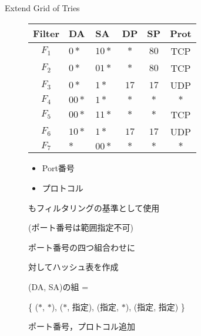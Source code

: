 \documentclass[12pt,dvipdfmx,mathserif,uplatex,aspectratio=32]{beamer}
\makeatletter
\newcommand{\tblcaption}[1]{\def\@captype{table}\caption{#1}}
\makeatother
\begin{document}
\begin{frame}{Extend Grid of Tries}

\begin{figure}[h]
 \def\@captype{table}
 \begin{minipage}[t]{.5\textwidth}
  {\scriptsize
  {\centering
  \begin{tabular}{c|l|l|c|c|c} 
   Filter   & DA      & SA     & DP     & SP     & Prot \\ \hline
   $F_{1} $ & $0*$    & $10*$  & $*$    & $80$   & TCP  \\ \hline
   $F_{2} $ & $0*$    & $01*$  & $*$    & $80$   & TCP  \\ \hline
   $F_{3} $ & $0*$    & $1*$   & $17$   & $17$   & UDP \\ \hline
   $F_{4} $ & $00*$   & $1*$   & $*$    & $*$    & $*$ \\ \hline
   $F_{5} $ & $00*$   & $11*$  & $*$    & $*$    & TCP \\ \hline
   $F_{6} $ & $10*$   & $1*$   & $17$   & $17$   & UDP \\ \hline
   $F_{7} $ & $*$     & $00*$  & $*$    & $*$    & $*$
  \end{tabular}
  \tblcaption{ポート番号，プロトコル追加}

  }
  }
  \end{minipage}
  \hfill
  \begin{minipage}[c]{.48\textwidth}
   \begin{itemize}
    \item Port番号
    \item プロトコル
   \end{itemize}
   もフィルタリングの基準として使用

\par
(ポート番号は範囲指定不可)
\par
\vspace{5mm}
ポート番号の四つ組合わせに \par 対してハッシュ表を作成
\par
\vspace{2mm}
(DA, SA)の組 =
\par  \{ ($*$, $*$), ($*$, 指定), (指定, $*$), (指定, 指定) \} 
  \end{minipage}
\end{figure}

\end{frame}
\end{document}
